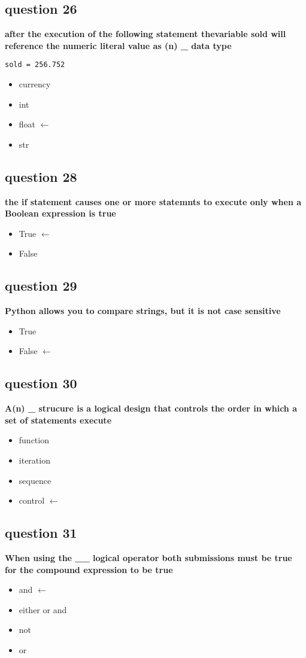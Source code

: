 \documentclass[10pt]{article}
\begin{document}
\subsection*{question 26}
\textbf{after the execution of the following statement thevariable sold will reference the numeric literal value as (n) \_ data type}
\begin{verbatim}
sold = 256.752
\end{verbatim}
\begin{itemize}
\item currency
\item int
\item float $\leftarrow$
\item str
\end{itemize}
\subsection*{question 28}
\textbf{the if statement causes one or more statemnts to execute only when a Boolean expression is true}
\begin{itemize}
\item True $\leftarrow$
\item False
\end{itemize}
\subsection*{question 29}
\textbf{Python allows you to compare strings, but it is not case sensitive}
\begin{itemize}
\item True
\item False $\leftarrow$
\end{itemize}
\subsection*{question 30}
\textbf{A(n) \_ strucure is a logical design that controls the order in which a set of statements execute}
\begin{itemize}
\item function
\item iteration
\item sequence
\item control $\leftarrow$
\end{itemize}
\subsection*{question 31}
\textbf{When using the \_\_ logical operator both submissions must be true for the compound expression to be true}
\begin{itemize}
\item and $\leftarrow$ 
\item either or and
\item not 
\item or
\end{itemize}
\end{document}
